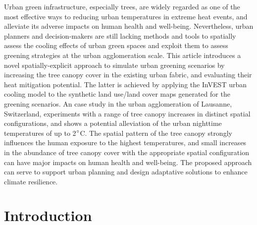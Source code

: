 \documentclass[10pt,letterpaper]{article}
\begin{document}
Urban green infrastructure, especially trees, are widely regarded as one of the most effective ways to reducing urban temperatures in extreme heat events, and alleviate its adverse impacts on human health and well-being.
Nevertheless, urban planners and decision-makers are still lacking methods and tools to spatially assess the cooling effects of urban green spaces and exploit them to assess greening strategies at the urban agglomeration scale.
This article introduces a novel spatially-explicit approach to simulate urban greening scenarios by increasing the tree canopy cover in the existing urban fabric, and evaluating their heat mitigation potential.
The latter is achieved by applying the InVEST urban cooling model to the synthetic land use/land cover maps generated for the greening scenarios.
An case study in the urban agglomeration of Lausanne, Switzerland, experiments with a range of tree canopy increases in distinct spatial configurations, and shows a potential alleviation of the urban nighttime temperatures of up to 2$\degree$C.
The spatial pattern of the tree canopy strongly influences the human exposure to the highest temperatures, and small increases in the abundance of tree canopy cover with the appropriate spatial configuration can have major impacts on human health and well-being.
The proposed approach can serve to support urban planning and design adaptative solutions to enhance climate resilience.


\linenumbers

\section*{Introduction}

\end{document}
